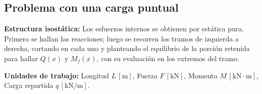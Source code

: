 \subsection{Problema con una carga puntual}



\begin{tcolorbox}[colback=white, colframe=myb!40, arc=4pt, boxrule=0.8pt, left=8pt, right=8pt, top=6pt, bottom=6pt]

    \textbf{Estructura isostática:} Los esfuerzos internos se obtienen por estática pura. Primero se hallan las reacciones; luego se recorren los tramos de izquierda a derecha, cortando en cada uno y planteando el equilibrio de la porción retenida para hallar $Q(x)$ y $M_f(x)$, con su evaluación en los extremos del tramo.\par\smallskip

    \small\textbf{Unidades de trabajo:} Longitud $L\,[\text{m}]$, Fuerza $F\,[\text{kN}]$, Momento $M\,[\text{kN}\cdot\text{m}]$, Carga repartida $q\,[\text{kN/m}]$.

\end{tcolorbox}










